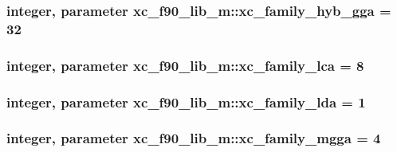 \hypertarget{classxc__f90__lib__m_a59454c43ef542f3201b310a7b9b5c843}{
\subsubsection[{xc\-\_\-family\-\_\-hyb\-\_\-gga}]{\setlength{\rightskip}{0pt plus 5cm}integer, parameter xc\-\_\-f90\-\_\-lib\-\_\-m\-::xc\-\_\-family\-\_\-hyb\-\_\-gga = 32}}\label{classxc__f90__lib__m_a59454c43ef542f3201b310a7b9b5c843}
\hypertarget{classxc__f90__lib__m_a4ff2f3f5248f15b4488f7a4e6c806366}{
\subsubsection[{xc\-\_\-family\-\_\-lca}]{\setlength{\rightskip}{0pt plus 5cm}integer, parameter xc\-\_\-f90\-\_\-lib\-\_\-m\-::xc\-\_\-family\-\_\-lca = 8}}\label{classxc__f90__lib__m_a4ff2f3f5248f15b4488f7a4e6c806366}
\hypertarget{classxc__f90__lib__m_adee6409373afd645d6eea8bd8e4a1eb3}{
\subsubsection[{xc\-\_\-family\-\_\-lda}]{\setlength{\rightskip}{0pt plus 5cm}integer, parameter xc\-\_\-f90\-\_\-lib\-\_\-m\-::xc\-\_\-family\-\_\-lda = 1}}\label{classxc__f90__lib__m_adee6409373afd645d6eea8bd8e4a1eb3}
\hypertarget{classxc__f90__lib__m_a46eb5b3dd856ee8298941daed45d088c}{
\subsubsection[{xc\-\_\-family\-\_\-mgga}]{\setlength{\rightskip}{0pt plus 5cm}integer, parameter xc\-\_\-f90\-\_\-lib\-\_\-m\-::xc\-\_\-family\-\_\-mgga = 4}}\label{classxc__f90__lib__m_a46eb5b3dd856ee8298941daed45d088c}
